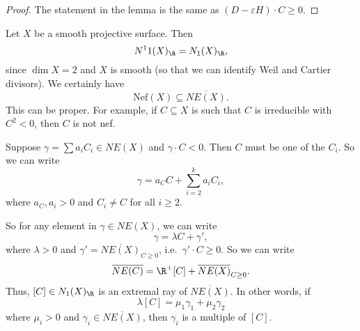 \documentclass[a4paper]{article}
\newcommand\Nef{\mathrm{Nef}}
\begin{document}
\begin{proof}
  The statement in the lemma is the same as $(D - \varepsilon H) \cdot C \geq 0$.
\end{proof}

\begin{eg}
  Let $X$ be a smooth projective surface. Then
  \[
    N^11(X)_\R = N_1(X)_\R,
  \]
  since $\dim X = 2$ and $X$ is smooth (so that we can identify Weil and Cartier divisors). We certainly have
  \[
    \Nef(X) \subseteq \overline{NE(X)}.
  \]
  This can be proper. For example, if $C \subseteq X$ is such that $C$ is irreducible with $C^2 < 0$, then $C$ is not nef.

  Suppose $\gamma = \sum a_i C_i \in NE(X)$ and $\gamma \cdot C < 0$. Then $C$ must be one of the $C_i$. So we can write
  \[
    \gamma = a_C C + \sum_{i = 2}^k a_i C_i,
  \]
  where $a_C, a_i > 0$ and $C_i \not= C$ for all $i \geq 2$.

  So for any element in $\gamma \in NE(X)$, we can write
  \[
    \gamma = \lambda C + \gamma',
  \]
  where $\lambda > 0$ and $\gamma' = \overline{NE(X)}_{C \geq 0}$, i.e.\ $\gamma' \cdot C \geq 0$. So we can write
  \[
    \overline{NE(C)} = \R^+[C] + \overline{NE(X)}_{C \geq 0}.
  \]
  Thus, $[C] \in N_1(X)_\R$ is an extremal ray of $\overline{NE(X)}$. In other words, if
  \[
    \lambda [C] = \mu_1 \gamma_1 + \mu_2 \gamma_2
  \]
  where $\mu_i > 0$ and $\gamma_i \in \overline{NE(X)}$, then $\gamma_i$ is a multiple of $[C]$.
\end{eg}
\end{document}
